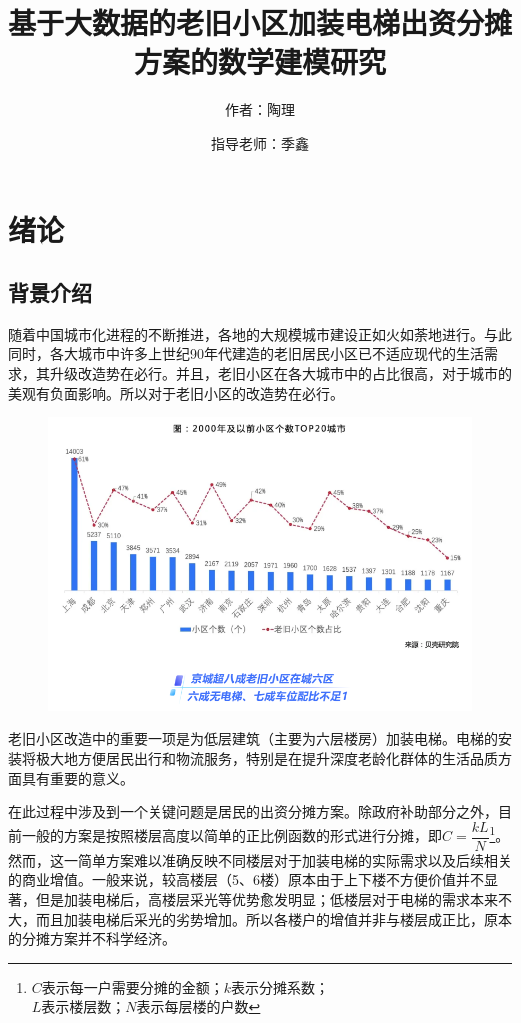 \documentclass[lang=cn,a4paper]{elegantpaper}
\title{基于大数据的老旧小区加装电梯出资分摊方案的数学建模研究}
\author{作者：陶理 \and 指导老师：季鑫}
\institute{上海市实验学校}
\date{\zhtoday}
\begin{document}
    \maketitle
    
    \begin{abstract}
    \end{abstract}

    \section{绪论}

    \subsection{背景介绍}

    随着中国城市化进程的不断推进，各地的大规模城市建设正如火如荼地进行。与此同时，各大城市中许多上世纪90年代建造的老旧居民小区已不适应现代的生活需求，其升级改造势在必行。并且，老旧小区在各大城市中的占比很高\cite{research.ke}，对于城市的美观有负面影响。所以对于老旧小区的改造势在必行。

    \begin{figure}[H]
        \centering
        \includegraphics[scale=0.3]{number of old.png}
    \end{figure}
    老旧小区改造中的重要一项是为低层建筑（主要为六层楼房）加装电梯。电梯的安装将极大地方便居民出行和物流服务，特别是在提升深度老龄化群体的生活品质方面具有重要的意义。
    
    在此过程中涉及到一个关键问题是居民的出资分摊方案。除政府补助部分之外，目前一般的方案是按照楼层高度以简单的正比例函数的形式进行分摊，即$C=\dfrac{kL}{N}$\footnote{$C$表示每一户需要分摊的金额；$k$表示分摊系数；\\$L$表示楼层数；$N$表示每层楼的户数}。然而，这一简单方案难以准确反映不同楼层对于加装电梯的实际需求以及后续相关的商业增值。一般来说，较高楼层（5、6楼）原本由于上下楼不方便价值并不显著，但是加装电梯后，高楼层采光等优势愈发明显；低楼层对于电梯的需求本来不大，而且加装电梯后采光的劣势增加。所以各楼户的增值并非与楼层成正比，原本的分摊方案并不科学经济。
    
\end{document}
